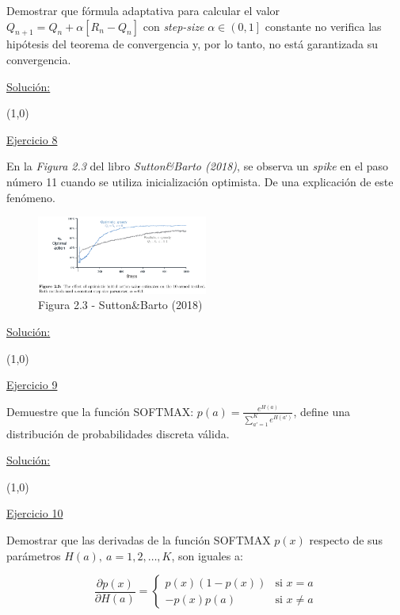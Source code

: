 \documentclass[12pt]{article}
\newlength\tindent
\renewcommand{\indent}{\hspace*{\tindent}}
\begin{document}
    Demostrar que fórmula adaptativa para calcular el valor $Q_{n+1}=Q_n+\alpha\left[R_n-Q_n\right]$ con  \textit{step-size} $\alpha\in\left(0,1\right]$ constante no verifica las hipótesis del teorema de convergencia y, por lo tanto, no está garantizada su convergencia.

    \indent\underline{Solución:}

    \lipsum[2]

    \line(1,0){\textwidth}

    \indent\underline{Ejercicio 8}

    En la \textit{Figura 2.3} del libro \textit{Sutton\&Barto (2018)}, se observa un \textit{spike} en el paso número 11 cuando se utiliza inicialización optimista.
    De una explicación de este fenómeno.

    \begin{figure}[H]
        \centering
        \includegraphics[width=0.5\textwidth]{../img/Figura2_3_SuttonBarto}
        \caption{Figura 2.3 - Sutton\&Barto (2018)}
        \label{fig:fig_2_3}
    \end{figure}

    \indent\underline{Solución:}

    \lipsum[2]

    \line(1,0){\textwidth}

    \indent\underline{Ejercicio 9}

    Demuestre que la función SOFTMAX: $p(a)=\frac{e^{H(a)}}{\sum_{a'=1}^{K} e^{H(a')}}$, define una distribución de probabilidades discreta válida.

    \indent\underline{Solución:}

    \lipsum[2]

    \line(1,0){\textwidth}

    \indent\underline{Ejercicio 10}

    Demostrar que las derivadas de la función SOFTMAX $p(x)$ respecto de sus parámetros $H(a),\ a=1,2,\dots,K$, son iguales a:

    \[
        \frac{\partial p(x)}{\partial H(a)} =
        \begin{cases}
            p(x)(1-p(x))    &\text{si $x = a$} \\
            -p(x)p(a)       &\text{si $x\neq a$}
        \end{cases}
    \]
\end{document}
